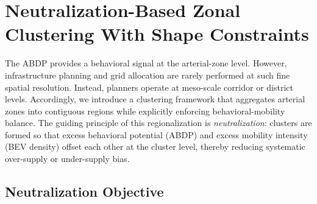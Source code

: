 \documentclass[conference]{IEEEtran}
\begin{document}
\section{Neutralization-Based Zonal Clustering With Shape Constraints}

The ABDP provides a behavioral signal
at the arterial-zone level. However, infrastructure planning and grid
allocation are rarely performed at such fine spatial resolution.
Instead, planners operate at meso-scale corridor or district levels.
Accordingly, we introduce a clustering framework that aggregates arterial zones into contiguous regions while explicitly enforcing behavioral-mobility balance. The guiding principle of this regionalization is \emph{neutralization}: clusters are formed so that excess behavioral
potential (ABDP) and excess mobility intensity (BEV density) offset each other at the cluster level, thereby reducing systematic over-supply or under-supply bias.






\subsection{Neutralization Objective}
\end{document}
